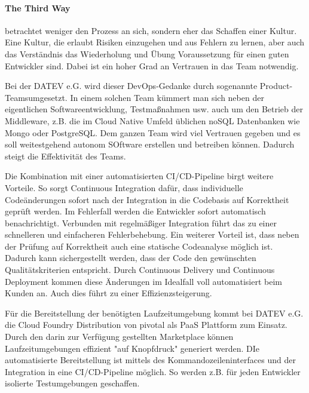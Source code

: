 \paragraph{\glqq The Third Way\grqq} betrachtet weniger den Prozess an sich, sondern eher das Schaffen einer Kultur.
Eine Kultur, die erlaubt Risiken einzugehen und aus Fehlern zu lernen, aber auch das Verständnis das Wiederholung und Übung Voraussetzung für einen guten Entwickler sind.
Dabei ist ein hoher Grad an Vertrauen in das Team notwendig.

Bei der DATEV e.G. wird dieser DevOps-Gedanke durch sogenannte \glqq Product-Teams\grqq umgesetzt.
In einem solchen Team kümmert man sich neben der eigentlichen Softwareentwicklung, Testmaßnahmen usw. auch um den Betrieb der Middleware, z.B. die im Cloud Native Umfeld üblichen noSQL Datenbanken wie Mongo oder PostgreSQL. 
Dem ganzen Team wird viel Vertrauen gegeben und es soll weitestgehend autonom SOftware erstellen und betreiben können.
Dadurch steigt die Effektivität des Teams.

Die Kombination mit einer automatisierten CI/CD-Pipeline birgt weitere Vorteile.
So sorgt Continuous Integration dafür, dass individuelle Codeänderungen sofort nach der Integration in die Codebasis auf Korrektheit geprüft werden.
Im Fehlerfall werden die Entwickler sofort automatisch benachrichtigt. 
Verbunden mit regelmäßiger Integration führt das zu einer schnelleren und einfacheren Fehlerbehebung.
Ein weiterer Vorteil ist, dass neben der Prüfung auf Korrektheit auch eine statische Codeanalyse möglich ist.
Dadurch kann sichergestellt werden, dass der Code den gewünschten Qualitätskriterien entspricht.
Durch Continuous Delivery und Continuous Deployment kommen diese Änderungen im Idealfall voll automatisiert beim Kunden an.
Auch dies führt  zu einer Effizienzsteigerung.

Für die Bereitstellung der benötigten Laufzeitumgebung kommt bei DATEV e.G. die Cloud Foundry Distribution von \glqq pivotal\grqq{} als PaaS Plattform zum Einsatz.
Durch den darin zur Verfügung gestellten \glqq Marketplace\grqq{} können Laufzeitumgebungen effizient "auf Knopfdruck" generiert werden.
DIe automatisierte Bereitstellung ist mittels des Kommandozeileninterfaces und der Integration in eine CI/CD-Pipeline möglich.
So werden z.B. für jeden Entwickler isolierte Testumgebungen geschaffen.

